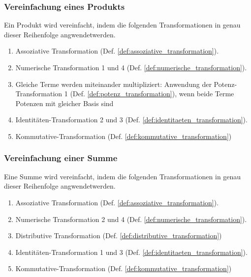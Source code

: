 \documentclass[11pt]{article}
\newcommand{\lab}[1]{(Def. \ref{#1})}
\begin{document}
\subsubsection{Vereinfachung eines Produkts}
Ein Produkt wird vereinfacht, indem die folgenden 
Transformationen in genau dieser Reihenfolge angwendetwerden.
\begin{enumerate}
  \item Assoziative Transformation \lab{def:assoziative_transformation}.
  \item Numerische Transformation 1 und 4 \lab{def:numerische_transformation}.
  \item Gleiche Terme werden miteinander multipliziert: Anwendung der Potenz-Transformation 1 
        \lab{def:potenz_transformation}, wenn beide Terme Potenzen mit gleicher Basis sind
  \item Identitäten-Transformation 2 und 3 \lab{def:identitaeten_transformation}.
  \item Kommutative-Transformation \lab{def:kommutative_transformation}
\end{enumerate}

\subsubsection{Vereinfachung einer Summe}
Eine Summe wird vereinfacht, indem die folgenden 
Transformationen in genau dieser Reihenfolge angwendetwerden.
\begin{enumerate}
  \item Assoziative Transformation \lab{def:assoziative_transformation}.
  \item Numerische Transformation 2 und 4 \lab{def:numerische_transformation}.
  \item Distributive Transformation \lab{def:distributive_transformation}
  \item Identitäten-Transformation 1 und 3 \lab{def:identitaeten_transformation}.
  \item Kommutative-Transformation \lab{def:kommutative_transformation}
\end{enumerate}
\end{document}
